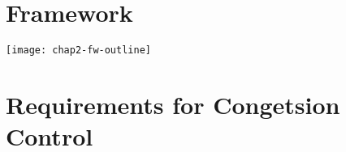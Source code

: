 

\section{Framework}
\label{fw.fw}


\texttt{[image: chap2-fw-outline]}

\section{Requirements for Congetsion Control}
\label{fw.cc.eval}